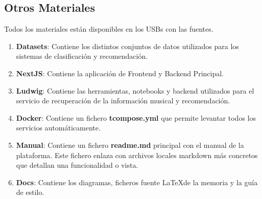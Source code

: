 \subsection{Otros Materiales}

Todos los materiales están disponibles en los USBs con las fuentes. 

\begin{enumerate}
    \item \textbf{Datasets}: Contiene los distintos conjuntos de datos utilizados para los sistemas de clasificación y recomendación. 
    \item \textbf{NextJS}: Contiene la aplicación de Frontend y Backend Principal.
    \item \textbf{Ludwig}: Contiene las herramientas, notebooks y backend utilizados para el servicio de recuperación de la información musical y recomendación.
    \item \textbf{Docker}: Contiene un fichero \textbf{tcompose.yml} que permite levantar todos los servicios automáticamente.
    \item \textbf{Manual}: Contiene un fichero \textbf{readme.md} principal con el manual de la plataforma. Este fichero enlaza con archivos locales markdown más concretos que detallan una funcionalidad o vista.
    \item \textbf{Docs}: Contiene los diagramas, ficheros fuente \LaTeX de la memoria y la guía de estilo. 
\end{enumerate}